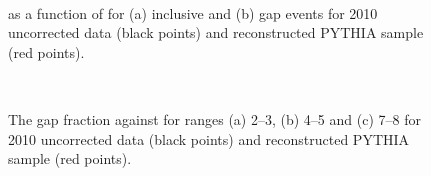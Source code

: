 \begin{figure}
\centering
\mbox{
              \quad
              \quad
                              }
\caption[]{
\mean{\costwodphi{}} as a function of \dy{} for (a) inclusive and (b) gap events for 2010 uncorrected data (black points) and reconstructed PYTHIA sample (red points).
\label{GBJ2:Uncorr:cos2}}
\end{figure}

\begin{figure}
\centering
\mbox{
      \quad
      \quad
}
\mbox{
      \quad
}
\caption[]{
The gap fraction against \qz{} for \dy{} ranges (a) 2--3, (b) 4--5 and (c) 7--8 for 2010 uncorrected data (black points) and reconstructed PYTHIA sample (red points).
\label{GBJ2:Uncorr:Q0}}
\end{figure}

